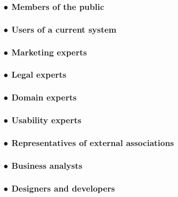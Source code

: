 \documentclass[
]{article}
\begin{document}
\hypertarget{members-of-the-public}{%
\subsubsection{● Members of the public}\label{members-of-the-public}}

\hypertarget{users-of-a-current-system}{%
\subsubsection{● Users of a current
system}\label{users-of-a-current-system}}

\hypertarget{marketing-experts}{%
\subsubsection{● Marketing experts}\label{marketing-experts}}

\hypertarget{legal-experts}{%
\subsubsection{● Legal experts}\label{legal-experts}}

\hypertarget{domain-experts}{%
\subsubsection{● Domain experts}\label{domain-experts}}

\hypertarget{usability-experts}{%
\subsubsection{● Usability experts}\label{usability-experts}}

\hypertarget{representatives-of-external-associations}{%
\subsubsection{\texorpdfstring{● Representatives of external
associations
}{● Representatives of external associations }}\label{representatives-of-external-associations}}

\hypertarget{business-analysts}{%
\subsubsection{● Business analysts}\label{business-analysts}}

\hypertarget{designers-and-developers}{%
\subsubsection{● Designers and
developers}\label{designers-and-developers}}
\end{document}
